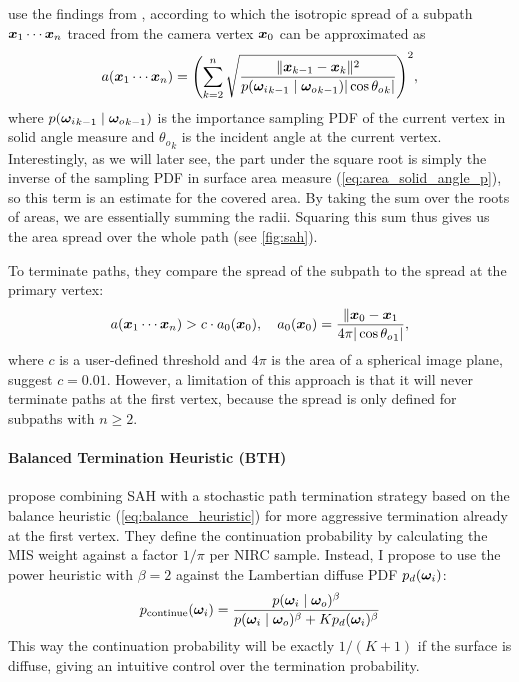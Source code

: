 \textcite{muller2021} use the findings from \textcite{bekaert2003}, according to which the isotropic spread of a subpath $\bm{x}_1 \cdots \bm{x}_n$ traced from the camera vertex $\bm{x}_0$ can be approximated as
\begin{equation}
    a(\x_1 \cdots \x_n) = \left(\sum_{k=2}^{n} \sqrt{\frac{\|\x_{k-1} - \x_k\|^2}{p(\wi_{k-1} \mid \wo_{k-1}) |\cos {\theta_o}_k|}}\right)^2,
\end{equation}
where $p({\bm{\omega}_i}_{k-1} \mid {\bm{\omega}_o}_{k-1})$ is the importance sampling PDF of the current vertex in solid angle measure and ${\theta_o}_k$ is the incident angle at the current vertex.
Interestingly, as we will later see, the part under the square root is simply the inverse of the sampling PDF in surface area measure (\cref{eq:area_solid_angle_p}), so this term is an estimate for the covered area.
By taking the sum over the roots of areas, we are essentially summing the radii.
Squaring this sum thus gives us the area spread over the whole path (see \cref{fig:sah}).

To terminate paths, they compare the spread of the subpath to the spread at the primary vertex:
\begin{equation}
    a(\bm{x}_1 \cdots \bm{x}_n) > c \cdot a_0(\bm{x}_0), \quad a_0(\bm{x}_0) = \frac{\|\bm{x}_0 - \bm{x}_1}{4 \pi |\cos {\theta_o}_1|},
\end{equation}
where $c$ is a user-defined threshold and $4\pi$ is the area of a spherical image plane, \textcite{muller2021} suggest $c=0.01$.
However, a limitation of this approach is that it will never terminate paths at the first vertex, because the spread is only defined for subpaths with $n \geq 2$.

\paragraph{Balanced Termination Heuristic (BTH)}
\label{par:pt_bth}
\textcite{dereviannykh2024} propose combining SAH with a stochastic path termination strategy based on the balance heuristic (\cref{eq:balance_heuristic}) for more aggressive termination already at the first vertex.
They define the continuation probability by calculating the MIS weight against a factor $1/\pi$ per NIRC sample.
Instead, I propose to use the power heuristic with $\beta=2$ against the Lambertian diffuse PDF $p_d({\bm{\omega}_i})$:
\begin{equation}
    p_{\text{continue}}({\bm{\omega}_i}) = \frac{p({\bm{\omega}_i} \mid {\bm{\omega}_o})^\beta}{p({\bm{\omega}_i} \mid {\bm{\omega}_o})^\beta + K p_d({\bm{\omega}_i})^\beta}
\end{equation}
This way the continuation probability will be exactly $1/(K+1)$ if the surface is diffuse, giving an intuitive control over the termination probability.

